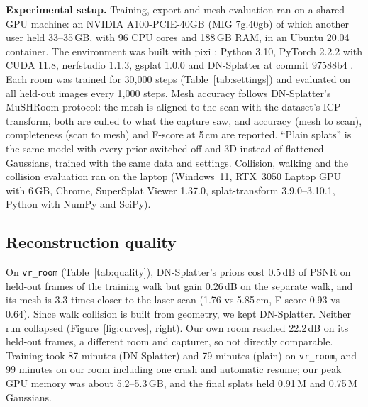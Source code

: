 \textbf{Experimental setup.} Training, export and mesh evaluation ran on a shared GPU machine: an NVIDIA A100-PCIE-40GB (MIG 7g.40gb) of which another user held 33--35\,GB, with 96 CPU cores and 188\,GB RAM, in an Ubuntu 20.04 container. The environment was built with pixi \cite{pixi}: Python 3.10, PyTorch 2.2.2 with CUDA 11.8, nerfstudio 1.1.3, gsplat 1.0.0 and DN-Splatter at commit 97588b4 \cite{dnsplattercode}. Each room was trained for 30,000 steps (Table~\ref{tab:settings}) and evaluated on all held-out images every 1,000 steps. Mesh accuracy follows DN-Splatter's MuSHRoom protocol: the mesh is aligned to the scan with the dataset's ICP transform, both are culled to what the capture saw, and accuracy (mesh to scan), completeness (scan to mesh) and F-score at 5\,cm are reported. ``Plain splats'' is the same model with every prior switched off and 3D instead of flattened Gaussians, trained with the same data and settings. Collision, walking and the collision evaluation ran on the laptop (Windows~11, RTX~3050 Laptop GPU with 6\,GB, Chrome, SuperSplat Viewer 1.37.0, splat-transform 3.9.0--3.10.1, Python with NumPy and SciPy).

\subsection{Reconstruction quality}
On \texttt{vr\_room} (Table~\ref{tab:quality}), DN-Splatter's priors cost 0.5\,dB of PSNR on held-out frames of the training walk but gain 0.26\,dB on the separate walk, and its mesh is 3.3 times closer to the laser scan (1.76 vs 5.85\,cm, F-score 0.93 vs 0.64). Since walk collision is built from geometry, we kept DN-Splatter. Neither run collapsed (Figure~\ref{fig:curves}, right). Our own room reached 22.2\,dB on its held-out frames, a different room and capturer, so not directly comparable. Training took 87 minutes (DN-Splatter) and 79 minutes (plain) on \texttt{vr\_room}, and 99 minutes on our room including one crash and automatic resume; our peak GPU memory was about 5.2--5.3\,GB, and the final splats held 0.91\,M and 0.75\,M Gaussians.

